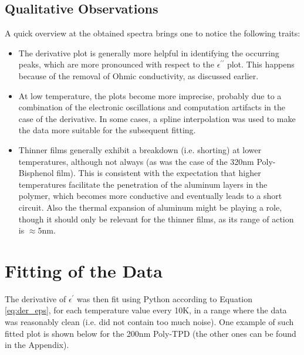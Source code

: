 \subsection{Qualitative Observations}
A quick overview at the obtained spectra brings one to notice the following traits:
\begin{itemize}
	\item{The derivative plot is generally  more helpful in identifying the occurring peaks, which are more pronounced with respect to the $\epsilon^{\prime\prime}$ plot. This happens because of the removal of Ohmic conductivity, as discussed earlier.} %
	\item{At low temperature, the plots become more imprecise, probably due to a combination of the electronic oscillations and computation artifacts in the case of the derivative. In some cases, a spline interpolation was used to make the data more suitable for the subsequent fitting.}
	\item{Thinner films generally exhibit a breakdown (i.e. shorting) at lower temperatures, although not always (as was the case of the 320nm Poly-Bisphenol film). This is consistent with the expectation that higher temperatures facilitate the penetration of the aluminum layers in the polymer, which becomes more conductive and eventually leads to a short circuit. Also the thermal expansion of aluminum might be playing a role, though it should only be relevant for the thinner films, as its range of action is $\approx 5 \text{nm}$}.
\end{itemize}














\section{Fitting of the Data}
The derivative of $\epsilon^{\prime}$ was then fit using Python according to Equation \ref{eq:der_eps}, for each temperature value every 10K, in a range where the data was reasonably clean (i.e. did not contain too much noise).
One example of such fitted plot is shown below for the 200nm Poly-TPD (the other ones can be found in the Appendix).







